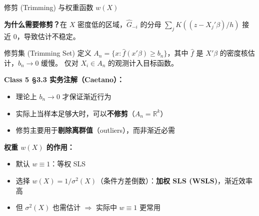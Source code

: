 \documentclass[aspectratio=169, 10pt]{beamer}
\begin{document}
\begin{frame}{修剪 (Trimming) 与权重函数 $w(X)$}

  \textbf{为什么需要修剪？}在 $X$ 密度低的区域，$\hat G_{-i}$ 的分母
  $\sum_j K((z - X_j'\beta)/h)$ 接近 $0$，导致估计不稳定。

  \begin{definitionbox}{{修剪集 (Trimming Set)}}
    定义 $A_n = \{x: \hat f(x'\beta) \geq b_n\}$，其中 $\hat f$ 是
    $X'\beta$ 的密度核估计，$b_n \to 0$ 缓慢。
    仅对 $X_i \in A_n$ 的观测计入目标函数。
  \end{definitionbox}

  \begin{keybox}
    \textbf{Class 5 §3.3 实务注解（Caetano）：}
    \begin{itemize}\setlength{\itemsep}{1pt}
      \item 理论上 $b_n \to 0$ 才保证渐近行为
      \item 实际上当样本足够大时，可以\textbf{不修剪}（$A_n = \mathbb{R}^k$）
      \item 修剪主要用于\textbf{剔除离群值}（outliers），而非渐近必需
    \end{itemize}
  \end{keybox}

  \textbf{权重 $w(X)$ 的作用：}
  \begin{itemize}\setlength{\itemsep}{1pt}
    \item 默认 $w \equiv 1$：等权 SLS
    \item 选择 $w(X) = 1/\sigma^2(X)$（条件方差倒数）：\textbf{加权 SLS (WSLS)}，渐近效率高
    \item 但 $\sigma^2(X)$ 也需估计 $\Rightarrow$ 实际中 $w \equiv 1$ 更常用
  \end{itemize}

\end{frame}
\end{document}
